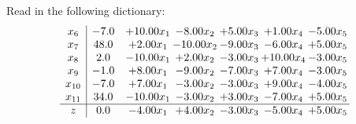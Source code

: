\documentclass[9pt]{article}
\begin{document}
Read in the following dictionary:
\[\begin{array}{c| c c@{\hskip 2pt} c@{\hskip 2pt} c@{\hskip 2pt} c@{\hskip 2pt} c@{\hskip 2pt} }
 x_{6}   &  -7.0 & + 10.00 x_{1} & -8.00 x_{2} & +  5.00 x_{3} & +  1.00 x_{4} & -5.00 x_{5}\\
 x_{7}   &  48.0 & +  2.00 x_{1} & -10.00 x_{2} & -9.00 x_{3} & -6.00 x_{4} & +  5.00 x_{5}\\
 x_{8}   &  2.0 & -10.00 x_{1} & +  2.00 x_{2} & -3.00 x_{3} & + 10.00 x_{4} & -3.00 x_{5}\\
 x_{9}   &  -1.0 & +  8.00 x_{1} & -9.00 x_{2} & -7.00 x_{3} & +  7.00 x_{4} & -3.00 x_{5}\\
 x_{10}   &  -7.0 & +  7.00 x_{1} & -3.00 x_{2} & -3.00 x_{3} & +  9.00 x_{4} & -4.00 x_{5}\\
 x_{11}   &  34.0 & -10.00 x_{1} & -3.00 x_{2} & +  3.00 x_{3} & -7.00 x_{4} & +  5.00 x_{5}\\
\hline
z    &  0.0 & -4.00 x_{1} & +  4.00 x_{2} & -3.00 x_{3} & -5.00 x_{4} & +  5.00 x_{5}\\
\end{array}\]
\end{document}
